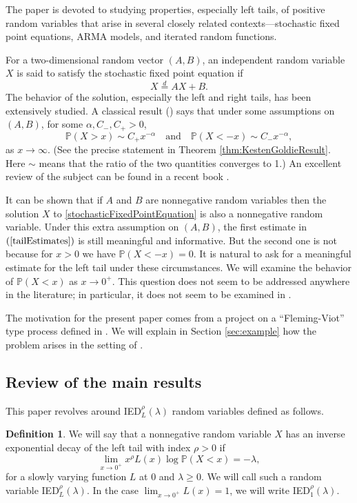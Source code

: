 \documentclass[bj]{imsart}
\numberwithin{equation}{section}
\renewcommand{\P}{\mathbb{P}}
\newcommand{\IGFT}{{\rm IED}}
\newcommand{\1}{\mathbf{1}}
\theoremstyle{definition}
\newtheorem{defin}[thm]{Definition}
\begin{document}
The paper is devoted to studying properties, especially left tails, of positive random variables that arise in several closely related contexts---stochastic fixed point equations, ARMA models,  and iterated random functions.

For a two-dimensional random vector $(A,B)$, an independent random variable $X$ is said to satisfy the stochastic fixed point equation 
if
\begin{equation}\label{stochasticFixedPointEquation}
X\stackrel{d}{=}AX+B. 
\end{equation}
The behavior of the solution, especially the left and right tails, has been extensively studied. A classical result (\cite{Kesten,GoldieAAP}) 
says that under some assumptions on $(A,B)$, for some $\alpha, C_-, C_+ >0$,
\begin{equation}\label{tailEstimates}
\P(X>x)\sim C_+x^{-\alpha}\quad \textrm{and}\quad \P(X<-x)\sim C_-x^{-\alpha}, 
\end{equation}
as $x\to\infty$. (See the precise statement in Theorem \ref{thm:KestenGoldieResult}. Here  $\sim$ means that the ratio of the two quantities converges to 1.)
An excellent review of  the subject can be found in a recent book \cite{X=AX+B}. 

It can be shown that 
if $A$ and $B$ are nonnegative random variables then the solution $X$ to \eqref{stochasticFixedPointEquation} is also a nonnegative random variable.
Under this extra assumption on $(A,B)$, the first estimate in $(\ref{tailEstimates})$ is still meaningful and informative. But the second one is not because for $x>0$ we have 
$\P(X<-x)=0$. 
It is natural to ask for a meaningful estimate for the left tail under these circumstances.  We will examine the behavior of $\P(X<x)$ as $x\to 0^+$. 
This question does not seem to be addressed anywhere in the literature; in particular,  it does not seem to be examined in \cite{X=AX+B}.

The motivation for the present paper comes from a project on a ``Fleming-Viot'' type process defined in \cite{BHM}. We will explain in Section \ref{sec:example} how the problem arises in the setting of \cite{extinctionOfFlemingViot}.

\subsection{Review of the main results}
This paper revolves around \IGFT$^\rho_L(\lambda)$ random variables defined as follows.

\begin{defin}\label{j15.3}
 We will say that a nonnegative random variable $X$ has an inverse exponential decay of the left tail with index $\rho>0$ if
\begin{equation}
\lim_{x\to 0^+}x^{\rho}L(x)\log \P(X<x)=-\lambda,\label{eq:definitionOfLambda0}
\end{equation}
for a slowly varying function $L$ at 0 and $\lambda\geq 0$.
We will call such a random variable \IGFT$^\rho_L(\lambda)$.
In the case $\lim_{x\to0^+}L(x)=1$, we will write \IGFT$_1^\rho(\lambda)$.
\end{defin}
\end{document}
